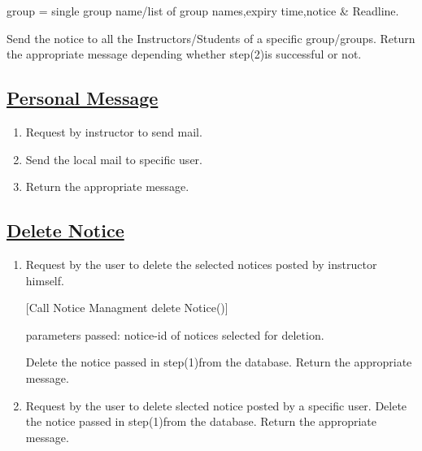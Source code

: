 \documentclass{article}
\begin{document}
	          	 group = single group name/list of group names,expiry time,notice \& Readline.
\begin{center}

\end{center}

	 Send the notice to all the Instructors/Students of a specific group/groups.
	 Return the appropriate message depending whether  step(2)is successful or not.

\subsection*{\underline{Personal Message}}
\begin{enumerate}
	\item Request by instructor to send mail.

	\item Send the local mail to specific user.

	\item Return the appropriate message.
\begin{center}

\end{center}
\end{enumerate}
\subsection*{\underline{Delete Notice}}
\begin{enumerate}
    \item
\begin{itemize}
 Request by the user to delete the selected notices posted by instructor himself.

		  [Call Notice Managment delete Notice()]

             parameters passed: notice-id of notices selected for deletion.

    Delete the notice passed in step(1)from the database.
    Return the appropriate message.
\begin{center}

\end{center}
\end{itemize}
    \item
\begin{itemize}
    Request by the user to delete slected notice posted by a specific user.
    Delete the notice passed in step(1)from the database.
    Return the appropriate message.
\begin{center}

\end{center}
\end{itemize}
\end{enumerate}
\end{document}
